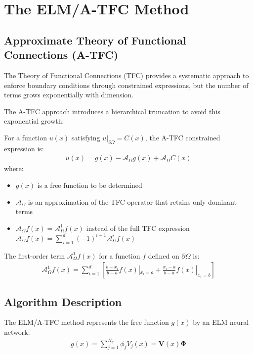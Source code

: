 \documentclass[11pt]{article}
\begin{document}
\section{The ELM/A-TFC Method}

\subsection{Approximate Theory of Functional Connections (A-TFC)}

The Theory of Functional Connections (TFC) provides a systematic approach to enforce boundary conditions through constrained expressions, but the number of terms grows exponentially with dimension.

The A-TFC approach introduces a hierarchical truncation to avoid this exponential growth:

For a function $u(x)$ satisfying $u|_{\partial\Omega} = C(x)$, the A-TFC constrained expression is:
\begin{align}
    u(x) = g(x) - \mathcal{A}_\Omega g(x) + \mathcal{A}_\Omega C(x)
\end{align}
where:
\begin{itemize}
    \item $g(x)$ is a free function to be determined
    \item $\mathcal{A}_\Omega$ is an approximation of the TFC operator that retains only dominant terms
    \item $\mathcal{A}_\Omega f(x) = \mathcal{A}_\Omega^1 f(x)$ instead of the full TFC expression $\mathcal{A}_\Omega f(x) = \sum_{i=1}^d (-1)^{i-1}\mathcal{A}_\Omega^i f(x)$
\end{itemize}

The first-order term $\mathcal{A}_\Omega^1 f(x)$ for a function $f$ defined on $\partial\Omega$ is:
\begin{align}
    \mathcal{A}_\Omega^1 f(x) = \sum_{i=1}^d \left[ \frac{b-x_i}{b-a}f(x)|_{x_i=a} + \frac{x_i-a}{b-a}f(x)|_{x_i=b} \right]
\end{align}

\subsection{Algorithm Description}

The ELM/A-TFC method represents the free function $g(x)$ by an ELM neural network:
\begin{align}
    g(x) = \sum_{j=1}^{N_g} \phi_j V_j(x) = \mathbf{V}(x)\mathbf{\Phi}
\end{align}
\end{document}
